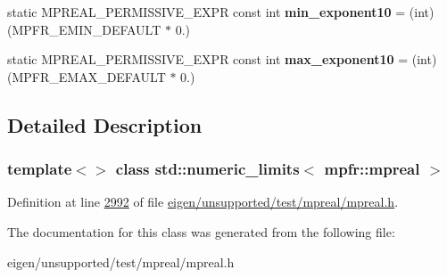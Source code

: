 \begin{DoxyCompactItemize}
\item 
\mbox{\label{classstd_1_1numeric__limits_3_01mpfr_1_1mpreal_01_4_adf6163cc171b48c087844dcf4e4a6b93}} 
static M\+P\+R\+E\+A\+L\+\_\+\+P\+E\+R\+M\+I\+S\+S\+I\+V\+E\+\_\+\+E\+X\+PR const int {\bfseries min\+\_\+exponent10} = (int) (M\+P\+F\+R\+\_\+\+E\+M\+I\+N\+\_\+\+D\+E\+F\+A\+U\+LT $\ast$ 0.)
\item 
\mbox{\label{classstd_1_1numeric__limits_3_01mpfr_1_1mpreal_01_4_a09e41a5b096bbd63b2c0f060b1dae6d7}} 
static M\+P\+R\+E\+A\+L\+\_\+\+P\+E\+R\+M\+I\+S\+S\+I\+V\+E\+\_\+\+E\+X\+PR const int {\bfseries max\+\_\+exponent10} = (int) (M\+P\+F\+R\+\_\+\+E\+M\+A\+X\+\_\+\+D\+E\+F\+A\+U\+LT $\ast$ 0.)
\end{DoxyCompactItemize}


\subsection{Detailed Description}
\subsubsection*{template$<$$>$\newline
class std\+::numeric\+\_\+limits$<$ mpfr\+::mpreal $>$}



Definition at line \hyperlink{eigen_2unsupported_2test_2mpreal_2mpreal_8h_source_l02992}{2992} of file \hyperlink{eigen_2unsupported_2test_2mpreal_2mpreal_8h_source}{eigen/unsupported/test/mpreal/mpreal.\+h}.



The documentation for this class was generated from the following file\+:\begin{DoxyCompactItemize}
\item 
eigen/unsupported/test/mpreal/mpreal.\+h\end{DoxyCompactItemize}
